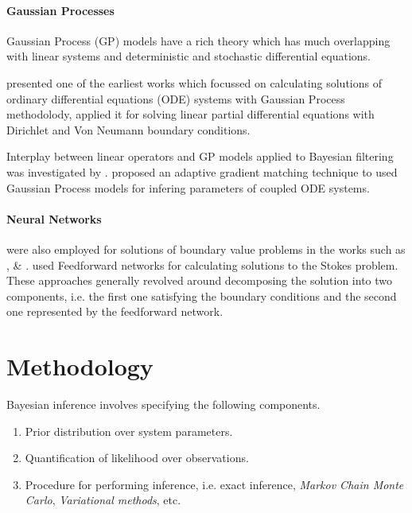 \documentclass{article}
\begin{document}
\paragraph{Gaussian Processes}

Gaussian Process (GP) models \citep{Rasmussen:2005:GPM:1162254} have a rich theory which has much overlapping with linear systems and deterministic and stochastic differential equations. 

\citet{Skilling1992} presented one of the earliest works which focussed on calculating solutions of ordinary differential equations (ODE) systems with Gaussian Process methodolody, \citet{Graepel} applied it for solving linear partial differential equations with Dirichlet and Von Neumann boundary conditions.

Interplay between linear operators and GP models applied to Bayesian filtering was investigated by \citet{Sarkka2011}. \citet{pmlr-v31-dondelinger13a} proposed an adaptive gradient matching technique to used Gaussian Process models for infering parameters of coupled ODE systems.

\paragraph{Neural Networks} were also employed for solutions of boundary value problems in the works such as \citet{Lagaris}, \citet{Aarts2001} \&  \citet{TSOULOS20092385}. \citet{Baymani2011} used Feedforward networks for calculating solutions to the Stokes problem. These approaches generally revolved around decomposing the solution into two components, i.e. the first one satisfying the boundary conditions and the second one represented by the feedforward network.

\section{Methodology}

Bayesian inference involves specifying the following components.
\begin{enumerate}
\item Prior distribution over system parameters.
\item Quantification of likelihood over observations.
\item Procedure for performing inference, i.e. exact inference, \emph{Markov Chain
    Monte Carlo}, \emph{Variational methods}, etc.
\end{enumerate}
\end{document}
